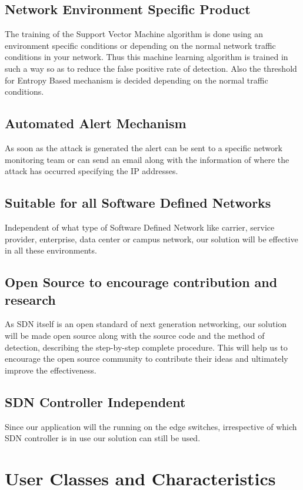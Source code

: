 \documentclass[12pt,a4paper,final]{report}
\begin{document}
\subsection{Network Environment Specific Product}
The training of the Support Vector Machine algorithm is done using an environment specific conditions or depending on the normal network traffic conditions in your network. Thus this machine learning algorithm is trained in such a way so as to reduce the false positive rate of detection. Also the threshold for Entropy Based mechanism is decided depending on the normal traffic conditions.

\subsection{Automated Alert Mechanism}
As soon as the attack is generated the alert can be sent to a specific network monitoring team or can send an email along with the information of where the attack has occurred specifying the IP addresses.

\subsection{Suitable for all Software Defined Networks}
Independent of what type of Software Defined Network like carrier, service provider, enterprise, data center or campus network, our solution will be effective in all these environments.

\subsection{Open Source to encourage contribution and research}
As SDN itself is an open standard of next generation networking, our solution will be made open source along with the source code and the method of detection, describing the step-by-step complete procedure. This will help us to encourage the open source community to contribute their ideas and ultimately improve the effectiveness.

\subsection{SDN Controller Independent}
Since our application will the running on the edge switches, irrespective of which SDN controller is in use our solution can still be used.

\section{User Classes and Characteristics}
\end{document}
